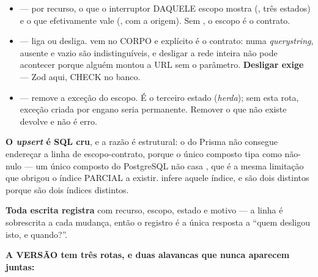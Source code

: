 \begin{itemize}
  \item {} --- por recurso, o que o interruptor
    DAQUELE escopo mostra (, três estados) e o que efetivamente
    vale (, com a origem). Sem , o escopo é o
    contrato.
  \item {} --- liga ou desliga. 
    vem no CORPO e  explícito é o contrato: numa \emph{querystring},
    ausente e vazio são indistinguíveis, e desligar a rede inteira não pode
    acontecer porque alguém montou a URL sem o parâmetro. \textbf{Desligar exige
    } --- Zod aqui, CHECK no banco.
  \item {} --- remove a exceção do escopo. É
    o terceiro estado (\emph{herda}); sem esta rota, exceção criada por engano
    seria permanente. Remover o que não existe devolve  e
    não é erro.
\end{itemize}

\textbf{O \emph{upsert} é SQL cru}, e a razão é estrutural: o  do
Prisma não consegue endereçar a linha de escopo-contrato, porque o único
composto  tipa  como não-nulo --- um
único composto do PostgreSQL não casa , que é a mesma limitação que
obrigou o índice PARCIAL a existir.  infere aquele índice, e são dois  distintos
porque são dois índices distintos.

\textbf{Toda escrita registra } com recurso,
escopo, estado e motivo --- a linha é sobrescrita a cada mudança, então o
registro é a única resposta a \enquote{quem desligou isto, e quando?}.

\textbf{A VERSÃO tem três rotas, e duas alavancas que nunca aparecem juntas:}


